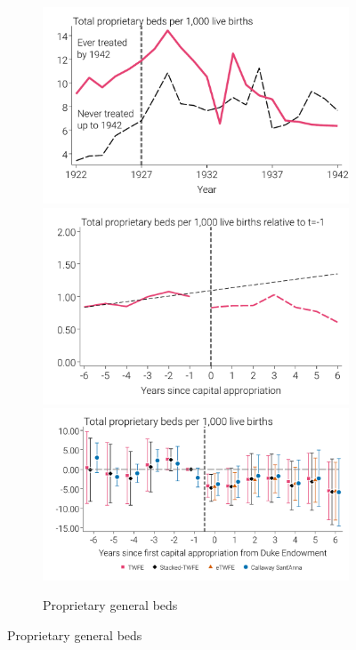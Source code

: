 \documentclass[12pt]{article}
\begin{document}
\begin{landscape}
\begin{figure}
\begin{minipage}{\linewidth}
\begin{subfigure}[b]{0.29\textwidth}
    \end{subfigure}
    \hfill %
    \begin{subfigure}[b]{0.29\textwidth}
        \centering
        \caption{{Proprietary general beds}}\label{fig:hosp-beds-prop}
        \includegraphics[width=\linewidth]{../analysis/output/main/figure_2c1_private_beds_by_year.pdf}
        \includegraphics[width=\linewidth]{../analysis/output/main/figure_2c2_private_beds_by_event_time.pdf}
        \includegraphics[width=\linewidth]{../analysis/output/main/figure_2c3_private_beds_first_stage.pdf}

\end{subfigure}
\end{minipage}
\end{figure}
\end{landscape}
\end{document}

